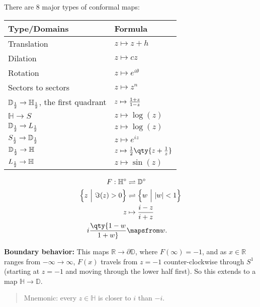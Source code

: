 \begin{theorem}

There are 8 major types of conformal maps:

\begin{longtable}[]{@{}
  >{\raggedright\arraybackslash}p{}
  >{\raggedright\arraybackslash}p{}@{}}
\toprule
Type/Domains & Formula \\
\midrule
\endhead
Translation & \(z\mapsto z + h\) \\
Dilation & \(z\mapsto cz\) \\
Rotation & \(z\mapsto e^{i\theta}\) \\
Sectors to sectors & \(z\mapsto z^n\) \\
\({\mathbb{D}}_{1\over 2} \to {\mathbb{H}}_{1\over 2}\), the first
quadrant & \(z\mapsto {1+z \over 1-z}\) \\
\({\mathbb{H}}\to S\) & \(z\mapsto \log(z)\) \\
\({\mathbb{D}}_{1\over 2} \to L_{1\over 2}\) & \(z\mapsto \log(z)\) \\
\(S_{1\over 2} \to {\mathbb{D}}_{1\over 2}\) & \(z\mapsto e^{iz}\) \\
\({\mathbb{D}}_{1\over 2} \to {\mathbb{H}}\) &
\(z\mapsto {1\over 2}\qty{z + {1\over z}}\) \\
\(L_{1\over 2} \to {\mathbb{H}}\) & \(z\mapsto \sin(z)\) \\
\bottomrule
\end{longtable}

\end{theorem}


\begin{proposition}

\begin{align*}
F: {\mathbb{H}}^\circ &\rightleftharpoons{\mathbb{D}}^\circ \\
\left\{{z{~\mathrel{\Big|}~}\Im(z) > 0 }\right\} &\rightleftharpoons\left\{{w{~\mathrel{\Big|}~}{\left\lvert {w} \right\rvert} < 1 }\right\} \\
z &\mapsto {i-z \over i+z} \\
i \qty{1-w \over 1+w} &\mapsfrom w
.\end{align*}

\textbf{Boundary behavior:} This maps
\({\mathbb{R}}\to {{\partial}}{\mathbb{D}}\), where \(F(\infty) = -1\),
and as \(x\in {\mathbb{R}}\) ranges from \(-\infty\to\infty\), \(F(x)\)
travels from \(z=-1\) counter-clockwise through \(S^1\) (starting at
\(z=-1\) and moving through the lower half first). So this extends to a
map \({\mathbb{H}}\to {\mathbb{D}}\).

\begin{quote}
Mnemonic: every \(z\in {\mathbb{H}}\) is closer to \(i\) than \(-i\).
\end{quote}

\end{proposition}

